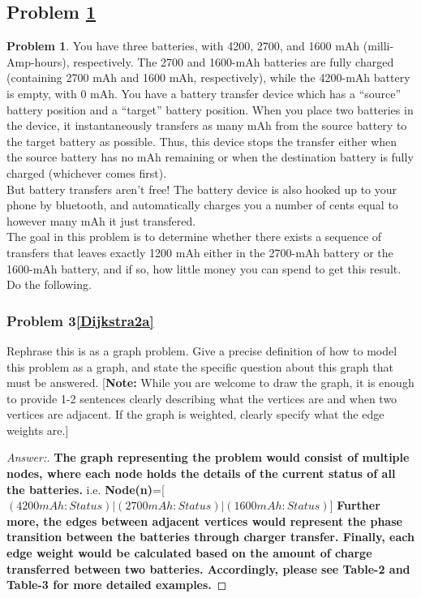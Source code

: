 \documentclass[11pt]{article}
\theoremstyle{definition}
\theoremstyle{definition}
\newtheorem{required}{Problem}
\theoremstyle{definition}
\begin{document}
\subsection{Problem \ref{Dijkstra2}} 
\begin{required} \label{Dijkstra2}
You have three batteries, with 4200, 2700, and 1600 mAh (milli-Amp-hours), respectively. The 2700 and 1600-mAh batteries are fully charged (containing 2700 mAh and 1600 mAh, respectively), while the 4200-mAh battery is empty, with 0 mAh. You have a battery transfer device which has a ``source'' battery position and a ``target'' battery position. When you place two batteries in the device, it instantaneously transfers as many mAh from the source battery to the target battery as possible. Thus, this device stops the transfer either when the source battery has no mAh remaining or when the destination battery is fully charged (whichever comes first).  \\

\noindent But battery transfers aren't free! The battery device is also hooked up to your phone by bluetooth, and automatically charges you a number of cents equal to however many mAh it just transfered.  \\
	
\noindent The goal in this problem is to determine whether there exists a sequence of transfers that leaves exactly 1200 mAh either in the 2700-mAh battery or the 1600-mAh battery, and if so, how little money you can spend to get this result. \\

\noindent Do the following.
\begin{enumerate}[label=(\alph*)]
\subsubsection{Problem 3\ref{Dijkstra2a}}
\item \label{Dijkstra2a} Rephrase this is as a graph problem. Give a precise definition of how to model this problem as a graph, and state the specific question about this graph that must be answered. [\textbf{Note:} While you are welcome to draw the graph, it is enough to provide 1-2 sentences clearly describing what the vertices are and when two vertices are adjacent. If the graph is weighted, clearly specify what the edge weights are.]

\begin{proof}[Answer:]

\item \textbf{The graph representing the problem would consist of multiple nodes, where each node holds the details of the current status of all the batteries.} i.e. \textbf{Node(n)}=[$(4200mAh : Status) | (2700mAh : Status) | (1600mAh : Status)$] \textbf{Further more, the edges between adjacent vertices would represent the phase transition between the batteries through charger transfer. Finally, each edge weight would be calculated based on the amount of charge transferred between two batteries. Accordingly, please see Table-2 and Table-3 for more detailed examples.}
	

\end{proof}
\end{enumerate}
\end{required}
\end{document}
